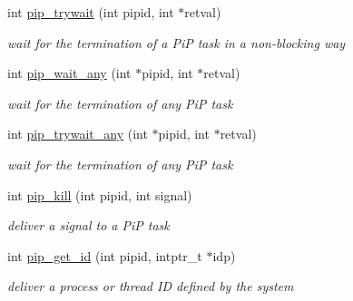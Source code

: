 \begin{DoxyCompactItemize}
\item 
int \hyperlink{group__libpip_ga02cab8b77b62ffcd98bd1bbb1e32b7e7}{pip\-\_\-trywait} (int pipid, int $\ast$retval)
\begin{DoxyCompactList}\small\item\em wait for the termination of a Pi\-P task in a non-\/blocking way \end{DoxyCompactList}\end{DoxyCompactItemize}
\begin{DoxyCompactItemize}
\item 
int \hyperlink{group__libpip_gade2b18ac0e11ec827ad68656591c7518}{pip\-\_\-wait\-\_\-any} (int $\ast$pipid, int $\ast$retval)
\begin{DoxyCompactList}\small\item\em wait for the termination of any Pi\-P task \end{DoxyCompactList}\end{DoxyCompactItemize}
\begin{DoxyCompactItemize}
\item 
int \hyperlink{group__libpip_ga65731447fedb85cbe4d5c38093383a20}{pip\-\_\-trywait\-\_\-any} (int $\ast$pipid, int $\ast$retval)
\begin{DoxyCompactList}\small\item\em wait for the termination of any Pi\-P task \end{DoxyCompactList}\end{DoxyCompactItemize}
\begin{DoxyCompactItemize}
\item 
int \hyperlink{group__libpip_ga4a396f38920d94b71dcfd3c898fbb82b}{pip\-\_\-kill} (int pipid, int signal)
\begin{DoxyCompactList}\small\item\em deliver a signal to a Pi\-P task \end{DoxyCompactList}\end{DoxyCompactItemize}
\begin{DoxyCompactItemize}
\item 
int \hyperlink{group__libpip_ga8ed1ba448edbc0f2e0af78abdcc62b7c}{pip\-\_\-get\-\_\-id} (int pipid, intptr\-\_\-t $\ast$idp)
\begin{DoxyCompactList}\small\item\em deliver a process or thread I\-D defined by the system \end{DoxyCompactList}\end{DoxyCompactItemize}
